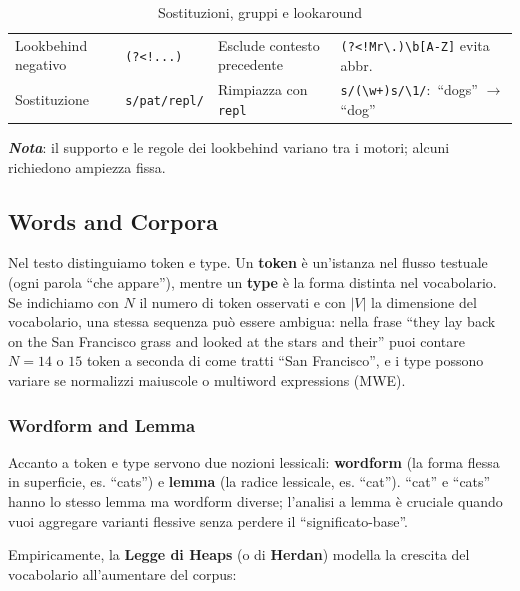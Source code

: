 \begin{table}[h]
\begin{tabular}{@{}llll@{}}
                Lookbehind negativo & \texttt{(?<!...)} & Esclude contesto precedente & \texttt{(?<!Mr\textbackslash .)\textbackslash b[A-Z]} evita abbr. \\
                
                Sostituzione & \texttt{s/pat/repl/} & Rimpiazza con \texttt{repl} & \texttt{s/(\textbackslash w+)s/\textbackslash 1/}:\ ``dogs'' $\to$ ``dog'' \\
                
                \bottomrule
                
            \end{tabular}

            \caption{Sostituzioni, gruppi e lookaround}
        \end{table}

        \noindent\textbf{\textit{Nota}}: il supporto e le regole dei lookbehind variano tra i motori; alcuni richiedono ampiezza fissa.

        \newpage
    
        \subsection{Words and Corpora}
        
            Nel testo distinguiamo token e type. Un \textbf{token} è un’istanza nel flusso testuale (ogni parola “che appare”), mentre un \textbf{type} è la forma distinta nel vocabolario. Se indichiamo con $N$ il numero di token osservati e con $|V|$ la dimensione del vocabolario, una stessa sequenza può essere ambigua: nella frase “they lay back on the San Francisco grass and looked at the stars and their” puoi contare $N=14$ o $15$ token a seconda di come tratti “San Francisco”, e i type possono variare se normalizzi maiuscole o multiword expressions (MWE).

            \subsubsection{Wordform and Lemma}

                Accanto a token e type servono due nozioni lessicali: \textbf{wordform} (la forma flessa in superficie, es. “cats”) e \textbf{lemma} (la radice lessicale, es. “cat”). “cat” e “cats” hanno lo stesso lemma ma wordform diverse; l’analisi a lemma è cruciale quando vuoi aggregare varianti flessive senza perdere il “significato-base”.
    
                Empiricamente, la \textbf{Legge di Heaps} (o di \textbf{Herdan}) modella la crescita del vocabolario all’aumentare del corpus:
    
